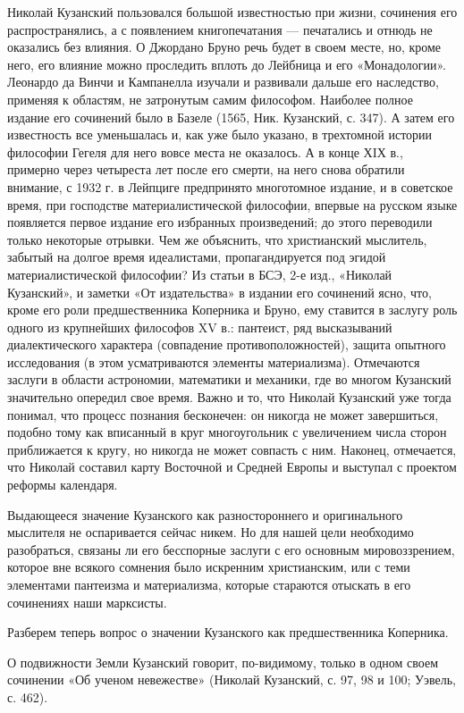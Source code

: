 Николай Кузанский пользовался большой известностью при жизни,
сочинения его распространялись, а с появлением книгопечатания ---
печатались и отнюдь не оказались без влияния. О Джордано Бруно речь
будет в своем месте, но, кроме него, его влияние можно проследить
вплоть до Лейбница и его «Монадологии». Леонардо да Винчи и Кампанелла
изучали и развивали дальше его наследство, применяя к областям, не
затронутым самим философом. Наиболее полное издание его сочинений было
в Базеле (1565, Ник. Кузанский, с. 347). А затем его известность все
уменьшалась и, как уже было указано, в трехтомной истории философии
Гегеля для него вовсе места не оказалось. А в конце ХIХ в., примерно
через четыреста лет после его смерти, на него снова обратили внимание,
с 1932 г. в Лейпциге предпринято многотомное издание, и в советское
время, при господстве материалистической философии, впервые на русском
языке появляется первое издание его избранных произведений; до этого
переводили только некоторые отрывки. Чем же объяснить, что
христианский мыслитель, забытый на долгое время идеалистами,
пропагандируется под эгидой материалистической философии? Из статьи в
БСЭ, 2-е изд., «Николай Кузанский», и заметки «От издательства» в
издании его сочинений ясно, что, кроме его роли предшественника
Коперника и Бруно, ему ставится в заслугу роль одного из крупнейших
философов XV в.: пантеист, ряд высказываний диалектического характера
(совпадение противоположностей), защита опытного исследования (в этом
усматриваются элементы материализма). Отмечаются заслуги в области
астрономии, математики и механики, где во многом Кузанский значительно
опередил свое время. Важно и то, что Николай Кузанский уже тогда
понимал, что процесс познания бесконечен: он никогда не может
завершиться, подобно тому как вписанный в круг многоугольник с
увеличением числа сторон приближается к кругу, но никогда не может
совпасть с ним. Наконец, отмечается, что Николай составил карту
Восточной и Средней Европы и выступал с проектом реформы календаря.

Выдающееся значение Кузанского как разностороннего и оригинального
мыслителя не оспаривается сейчас никем. Но для нашей цели необходимо
разобраться, связаны ли его бесспорные заслуги с его основным
мировоззрением, которое вне всякого сомнения было искренним
христианским, или с теми элементами пантеизма и материализма, которые
стараются отыскать в его сочинениях наши марксисты.

Разберем теперь вопрос о значении Кузанского как предшественника
Коперника.

О подвижности Земли Кузанский говорит, по-видимому, только в одном
своем сочинении «Об ученом невежестве» (Николай Кузанский, с. 97, 98 и
100; Уэвель, с. 462).

